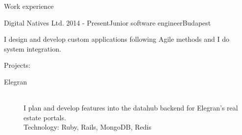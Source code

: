 \documentclass{resume} %
\begin{document}
\begin{rSection}{Work experience}

\begin{rSubsection}{Digital Natives Ltd.}
{2014 - Present}{Junior software engineer}{Budapest}
\item I design and develop custom applications following Agile methods and I do system integration.
\item Projects:
	\begin{description}
		\item[Elegran] \hfill \\
		I plan and develop features into the datahub backend for Elegran’s real estate portals. \\
		Technology: Ruby, Rails, MongoDB, Redis
	\end{description}
\end{rSubsection}


\end{rSection}
\end{document}
